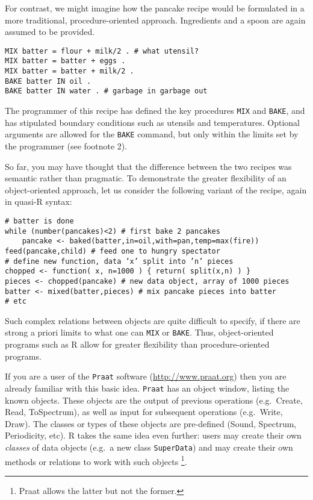 \documentclass[
]{book}
\begin{document}
For contrast, we might imagine how the pancake recipe would be
formulated in a more traditional, procedure-oriented approach.
Ingredients and a spoon are again assumed to be provided.

\begin{verbatim}
MIX batter = flour + milk/2 . # what utensil? 
MIX batter = batter + eggs . 
MIX batter = batter + milk/2 .
BAKE batter IN oil .
BAKE batter IN water . # garbage in garbage out
\end{verbatim}

The programmer of this recipe has defined the key procedures \texttt{MIX} and
\texttt{BAKE}, and has stipulated boundary conditions such as utensils and
temperatures. Optional arguments are allowed for the \texttt{BAKE} command, but
only within the limits set by the programmer (see footnote 2).

So far, you may have thought that the difference between the two recipes
was semantic rather than pragmatic. To demonstrate the greater
flexibility of an object-oriented approach, let us consider the
following variant of the recipe, again in quasi-R syntax:

\begin{verbatim}
# batter is done
while (number(pancakes)<2) # first bake 2 pancakes
    pancake <- baked(batter,in=oil,with=pan,temp=max(fire))
feed(pancake,child) # feed one to hungry spectator
# define new function, data ’x’ split into ’n’ pieces
chopped <- function( x, n=1000 ) { return( split(x,n) ) } 
pieces <- chopped(pancake) # new data object, array of 1000 pieces
batter <- mixed(batter,pieces) # mix pancake pieces into batter
# etc
\end{verbatim}

Such complex relations between objects are quite difficult to specify,
if there are strong a priori limits to what one can \texttt{MIX} or \texttt{BAKE}.
Thus, object-oriented programs such as R allow for
greater flexibility than procedure-oriented programs.

If you are a user of the \texttt{Praat} software (\url{http://www.praat.org}) then you are already familiar with this basic idea.
\texttt{Praat} has an object window, listing the known objects.
These objects are the output of previous operations (e.g.~Create, Read,
ToSpectrum), as well as input for subsequent operations (e.g.~Write,
Draw). The classes or types of these objects are pre-defined (Sound,
Spectrum, Periodicity, etc). R takes the same idea even
further: users may create their own \emph{classes} of data objects (e.g.~a new
class \texttt{SuperData}) and may create their own methods or relations to work with
such objects \footnote{Praat allows the latter but not the former.}.
\end{document}
